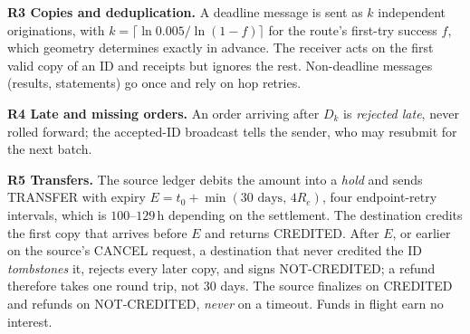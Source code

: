 \documentclass[11pt]{article}
\theoremstyle{definition}
\theoremstyle{remark}
\newcommand{\h}{\,\mathrm{h}}
\begin{document}
\textbf{R3 Copies and deduplication.} A deadline message is sent as $k$ independent originations, with $k=\lceil\ln 0.005/\ln(1-f)\rceil$ for the route's first-try success $f$, which geometry determines exactly in advance. The receiver acts on the first valid copy of an ID and receipts but ignores the rest. Non-deadline messages (results, statements) go once and rely on hop retries.

\textbf{R4 Late and missing orders.} An order arriving after $D_k$ is \emph{rejected late}, never rolled forward; the accepted-ID broadcast tells the sender, who may resubmit for the next batch.

\textbf{R5 Transfers.} The source ledger debits the amount into a \emph{hold} and sends TRANSFER with expiry $E = t_0 + \min(30\text{ days},\,4R_e)$, four endpoint-retry intervals, which is $100$--$129\h$ depending on the settlement. The destination credits the first copy that arrives before $E$ and returns CREDITED. After $E$, or earlier on the source's CANCEL request, a destination that never credited the ID \emph{tombstones} it, rejects every later copy, and signs NOT-CREDITED; a refund therefore takes one round trip, not 30 days. The source finalizes on CREDITED and refunds on NOT-CREDITED, \emph{never} on a timeout. Funds in flight earn no interest.
\end{document}
